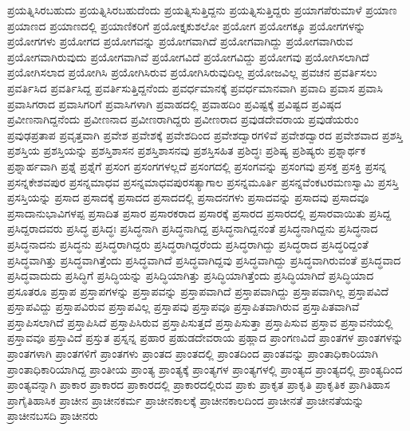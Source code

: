{ಪ್ರಯತ್ನಿಸಿರಬಹುದು
ಪ್ರಯತ್ನಿಸಿರಬಹುದೆಂದು
ಪ್ರಯತ್ನಿಸುತ್ತಿದ್ದನು
ಪ್ರಯತ್ನಿಸುತ್ತಿದ್ದರು
ಪ್ರಯಾಗಪೆರುಮಾಳೆ
ಪ್ರಯಾಣ
ಪ್ರಯಾಣದ
ಪ್ರಯಾಣದಲ್ಲಿ
ಪ್ರಯಾಣಿಕರಿಗೆ
ಪ್ರಯೋಕ್ತೃಕುಶಲೋ
ಪ್ರಯೋಗ
ಪ್ರಯೋಗಕ್ಕೂ
ಪ್ರಯೋಗಗಳನ್ನು
ಪ್ರಯೋಗಗಳು
ಪ್ರಯೋಗದ
ಪ್ರಯೋಗವನ್ನು
ಪ್ರಯೋಗವಾಗಿದೆ
ಪ್ರಯೋಗವಾಗಿದ್ದು
ಪ್ರಯೋಗವಾಗಿರುವ
ಪ್ರಯೋಗವಾಗಿರುವುದು
ಪ್ರಯೋಗವಾಗಿವೆ
ಪ್ರಯೋಗವಿದೆ
ಪ್ರಯೋಗವಿದ್ದು
ಪ್ರಯೋಗವು
ಪ್ರಯೋಗಿಸಲಾಗಿದೆ
ಪ್ರಯೋಗಿಸಲಾದ
ಪ್ರಯೋಗಿಸಿ
ಪ್ರಯೋಗಿಸಿರುವ
ಪ್ರಯೋಗಿಸಿರುವುದಿಲ್ಲ
ಪ್ರಯೋಜವಿಲ್ಲ
ಪ್ರವಚನ
ಪ್ರವರ್ತಿಸಲು
ಪ್ರವರ್ತಿಸಿದ
ಪ್ರವರ್ತಿಸಿದ್ದ
ಪ್ರವರ್ತಿಸುತ್ತಿದ್ದನೆಂದು
ಪ್ರವರ್ಧಮಾನಕ್ಕೆ
ಪ್ರವರ್ಧಮಾನವಾಗಿ
ಪ್ರವಾದಿ
ಪ್ರವಾಸ
ಪ್ರವಾಸಿ
ಪ್ರವಾಸಿಗರಾದ
ಪ್ರವಾಸಿಗರಿಗೆ
ಪ್ರವಾಸಿಗಳಾಗಿ
ಪ್ರವಾಹದಲ್ಲಿ
ಪ್ರವಾಹದಿಂ
ಪ್ರವಿಷ್ಟಕ್ಕೆ
ಪ್ರವಿಷ್ಟದ
ಪ್ರವಿಷ್ಠದ
ಪ್ರವೀಣನಾಗಿದ್ದನೆಂದು
ಪ್ರವೀಣನಾದ
ಪ್ರವೀಣರಾಗಿದ್ದರು
ಪ್ರವೀಣರಾದ
ಪ್ರವುಡದೇವರಾಯ
ಪ್ರವುಡೆಯರುಂ
ಪ್ರವುಢಪ್ರತಾಪ
ಪ್ರವೃತ್ತವಾಗಿ
ಪ್ರವೇಶ
ಪ್ರವೇಶಕ್ಕೆ
ಪ್ರವೇಶದಿಂದ
ಪ್ರವೇಶದ್ವಾರಗಳಿವೆ
ಪ್ರವೇಶದ್ವಾರದ
ಪ್ರವೇಶವಾದ
ಪ್ರಶಸ್ತಿ
ಪ್ರಶಸ್ತಿಯ
ಪ್ರಶಸ್ತಿಯನ್ನು
ಪ್ರಶಸ್ತಿಶಾಸನ
ಪ್ರಶಸ್ತಿಶಾಸನವು
ಪ್ರಶಸ್ತಿಸಹಿತ
ಪ್ರಶಿದ್ಧಃ
ಪ್ರಶಿಷ್ಯ
ಪ್ರಶಿಷ್ಯರು
ಪ್ರಶ್ನಾರ್ಥಕ
ಪ್ರಶ್ನಾರ್ಹವಾಗಿ
ಪ್ರಶ್ನೆ
ಪ್ರಶ್ನೆಗೆ
ಪ್ರಸಂಗ
ಪ್ರಸಂಗಗಳಲ್ಲದೆ
ಪ್ರಸಂಗದಲ್ಲಿ
ಪ್ರಸಂಗವನ್ನು
ಪ್ರಸಂಗವು
ಪ್ರಸಕ್ತ
ಪ್ರಸಕ್ತಿ
ಪ್ರಸನ್ನ
ಪ್ರಸನ್ನಕೇಶವಪುರ
ಪ್ರಸನ್ನಮಾಧವ
ಪ್ರಸನ್ನಮಾಧವಪುರಸತ್ಯಾಗಾಲ
ಪ್ರಸನ್ನಮೂರ್ತಿ
ಪ್ರಸನ್ನವೆಂಕಟರಮಣಸ್ವಾಮಿ
ಪ್ರಸಸ್ತಿ
ಪ್ರಸಸ್ತಿಯನ್ನು
ಪ್ರಸಾದ
ಪ್ರಸಾದಕ್ಕೆ
ಪ್ರಸಾದದ
ಪ್ರಸಾದದಲ್ಲಿ
ಪ್ರಸಾದನಗಳು
ಪ್ರಸಾದವನ್ನು
ಪ್ರಸಾದವು
ಪ್ರಸಾದವೂ
ಪ್ರಸಾದಾನುಭಾವಿಗಳಪ್ಪ
ಪ್ರಸಾದಿತ
ಪ್ರಸಾರ
ಪ್ರಸಾರಕರಾದ
ಪ್ರಸಾರಕ್ಕೆ
ಪ್ರಸಾರದ
ಪ್ರಸಾರದಲ್ಲಿ
ಪ್ರಸಾರವಾಯಿತು
ಪ್ರಸಿದ್ದ
ಪ್ರಸಿದ್ದರಾದವರು
ಪ್ರಸಿದ್ಧ
ಪ್ರಸಿದ್ಧಃ
ಪ್ರಸಿದ್ಧನಾಗಿ
ಪ್ರಸಿದ್ಧನಾಗಿದ್ದ
ಪ್ರಸಿದ್ಧನಾಗಿದ್ದನಂತೆ
ಪ್ರಸಿದ್ಧನಾಗಿದ್ದನು
ಪ್ರಸಿದ್ಧನಾದ
ಪ್ರಸಿದ್ಧನಾದನು
ಪ್ರಸಿದ್ಧನು
ಪ್ರಸಿದ್ಧರಾಗಿದ್ದರು
ಪ್ರಸಿದ್ಧರಾಗಿದ್ದರೆಂದು
ಪ್ರಸಿದ್ಧರಾಗಿದ್ದು
ಪ್ರಸಿದ್ಧರಾದ
ಪ್ರಸಿದ್ಧರಿದ್ದಂತೆ
ಪ್ರಸಿದ್ಧವಾಗಿತ್ತು
ಪ್ರಸಿದ್ಧವಾಗಿತ್ತೆಂದು
ಪ್ರಸಿದ್ಧವಾಗಿದೆ
ಪ್ರಸಿದ್ಧವಾಗಿದ್ದವು
ಪ್ರಸಿದ್ಧವಾಗಿದ್ದು
ಪ್ರಸಿದ್ಧವಾಗಿರುವಂತೆ
ಪ್ರಸಿದ್ಧವಾದ
ಪ್ರಸಿದ್ಧವಾದುದು
ಪ್ರಸಿದ್ಧಿಗೆ
ಪ್ರಸಿದ್ಧಿಯನ್ನು
ಪ್ರಸಿದ್ಧಿಯಾಗಿತ್ತು
ಪ್ರಸಿದ್ಧಿಯಾಗಿತ್ತೆಂದು
ಪ್ರಸಿದ್ಧಿಯಾಗಿದೆ
ಪ್ರಸಿದ್ಧಿಯಾದ
ಪ್ರಸೂತರೂ
ಪ್ರಸ್ತಾಪ
ಪ್ರಸ್ತಾಪಗಳನ್ನು
ಪ್ರಸ್ತಾಪವನ್ನು
ಪ್ರಸ್ತಾಪವಾಗಿದೆ
ಪ್ರಸ್ತಾಪವಾಗಿದ್ದು
ಪ್ರಸ್ತಾಪವಾಗಿಲ್ಲ
ಪ್ರಸ್ತಾಪವಿದೆ
ಪ್ರಸ್ತಾಪವಿದ್ದು
ಪ್ರಸ್ತಾಪವಿರುವ
ಪ್ರಸ್ತಾಪವಿಲ್ಲ
ಪ್ರಸ್ತಾಪವು
ಪ್ರಸ್ತಾಪವೂ
ಪ್ರಸ್ತಾಪಿತವಾಗಿರುವ
ಪ್ರಸ್ತಾಪಿತವಾಗಿವೆ
ಪ್ರಸ್ತಾಪಿಸಲಾಗಿದೆ
ಪ್ರಸ್ತಾಪಿಸಿದೆ
ಪ್ರಸ್ತಾಪಿಸಿರುವ
ಪ್ರಸ್ತಾಪಿಸುತ್ತದೆ
ಪ್ರಸ್ತಾಪಿಸುತ್ತಾ
ಪ್ರಸ್ತಾಪಿಸುವ
ಪ್ರಸ್ತಾವ
ಪ್ರಸ್ತಾವನೆಯಲ್ಲಿ
ಪ್ರಸ್ತಾವವೂ
ಪ್ರಸ್ತಾವಿದೆ
ಪ್ರಸ್ತುತ
ಪ್ರಸ್ನನ್ನ
ಪ್ರಹಾರ
ಪ್ರಹುಡದೇವರಾಯ
ಪ್ರಹ್ಲಾದ
ಪ್ರಾಂಗಣವಿದೆ
ಪ್ರಾಂತಗಳ
ಪ್ರಾಂತಗಳನ್ನು
ಪ್ರಾಂತಗಳಾಗಿ
ಪ್ರಾಂತಗಳಿಗೆ
ಪ್ರಾಂತಗಳು
ಪ್ರಾಂತದ
ಪ್ರಾಂತದಲ್ಲಿ
ಪ್ರಾಂತದಿಂದ
ಪ್ರಾಂತವನ್ನು
ಪ್ರಾಂತಾಧಿಕಾರಿಯಾಗಿ
ಪ್ರಾಂತಾಧಿಕಾರಿಯಾಗಿದ್ದ
ಪ್ರಾಂತೀಯ
ಪ್ರಾಂತ್ಯ
ಪ್ರಾಂತ್ಯಕ್ಕೆ
ಪ್ರಾಂತ್ಯಗಳ
ಪ್ರಾಂತ್ಯಗಳಲ್ಲಿ
ಪ್ರಾಂತ್ಯದ
ಪ್ರಾಂತ್ಯದಲ್ಲಿ
ಪ್ರಾಂತ್ಯದಿಂದ
ಪ್ರಾಂತ್ಯವನ್ನಾಗಿ
ಪ್ರಾಕಾರ
ಪ್ರಾಕಾರದ
ಪ್ರಾಕಾರದಲ್ಲಿ
ಪ್ರಾಕಾರದಲ್ಲಿರುವ
ಪ್ರಾಕು
ಪ್ರಾಕೃತ
ಪ್ರಾಕೃತಿ
ಪ್ರಾಕೃತಿಕ
ಪ್ರಾಗಿತಿಹಾಸ
ಪ್ರಾಗೈತಿಹಾಸಿಕ
ಪ್ರಾಚೀನ
ಪ್ರಾಚೀನಕರ್ಮ
ಪ್ರಾಚೀನಕಾಲಕ್ಕೆ
ಪ್ರಾಚೀನಕಾಲದಿಂದ
ಪ್ರಾಚೀನತೆ
ಪ್ರಾಚೀನತೆಯನ್ನು
ಪ್ರಾಚೀನಬಸದಿ
ಪ್ರಾಚೀನರು
}

